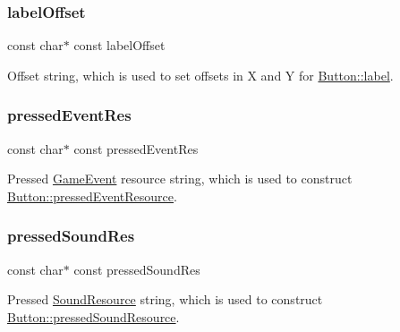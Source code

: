 \subsubsection{\texorpdfstring{label\+Offset}{labelOffset}}
{\footnotesize\ttfamily const char$\ast$ const label\+Offset}

Offset string, which is used to set offsets in X and Y for \hyperlink{struct_button_ab278201aa1758916bc9e825b3833e31b}{Button\+::label}. \hypertarget{struct_button_scene_node__parser_strings_aa63f78ed02ab8fb2518965ba94954854}{}\label{struct_button_scene_node__parser_strings_aa63f78ed02ab8fb2518965ba94954854} 
\subsubsection{\texorpdfstring{pressed\+Event\+Res}{pressedEventRes}}
{\footnotesize\ttfamily const char$\ast$ const pressed\+Event\+Res}

Pressed \hyperlink{struct_game_event}{Game\+Event} resource string, which is used to construct \hyperlink{struct_button_a4f009b181e2d1679d58eeb638c79f1f7}{Button\+::pressed\+Event\+Resource}. \hypertarget{struct_button_scene_node__parser_strings_a5257ecd9dcd85813b88cb459d9bd8a81}{}\label{struct_button_scene_node__parser_strings_a5257ecd9dcd85813b88cb459d9bd8a81} 
\subsubsection{\texorpdfstring{pressed\+Sound\+Res}{pressedSoundRes}}
{\footnotesize\ttfamily const char$\ast$ const pressed\+Sound\+Res}

Pressed \hyperlink{struct_sound_resource}{Sound\+Resource} string, which is used to construct \hyperlink{struct_button_a9d6a7ab6b4708d54a3e7da0a665609b2}{Button\+::pressed\+Sound\+Resource}. \hypertarget{struct_button_scene_node__parser_strings_a008090dd7a5af169656ea5a85a437385}{}\label{struct_button_scene_node__parser_strings_a008090dd7a5af169656ea5a85a437385} 
